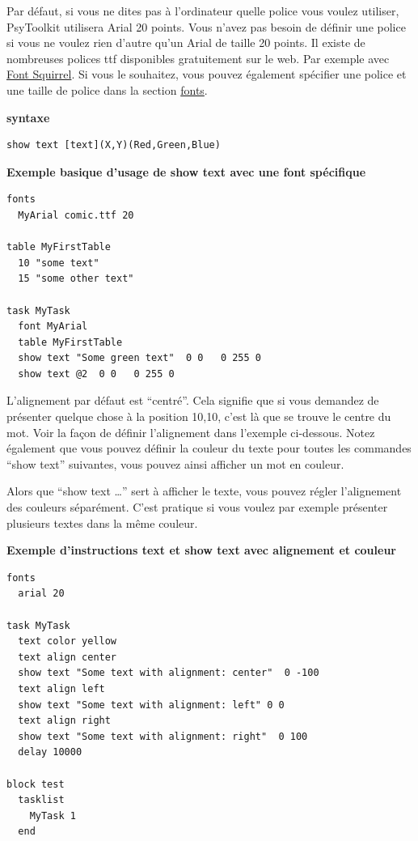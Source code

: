 \documentclass[
]{book}
\begin{document}
Par défaut, si vous ne dites pas à l'ordinateur quelle police vous
voulez utiliser, PsyToolkit utilisera Arial 20 points. Vous n'avez pas
besoin de définir une police si vous ne voulez rien d'autre qu'un Arial
de taille 20 points. Il existe de nombreuses polices ttf disponibles
gratuitement sur le web. Par exemple avec
\href{https://www.fontsquirrel.com/}{Font Squirrel}. Si vous le
souhaitez, vous pouvez également spécifier une police et une taille de
police dans la section \protect\hyperlink{fonts}{fonts}.

\textbf{syntaxe}

\begin{verbatim}
show text [text](X,Y)(Red,Green,Blue)
\end{verbatim}

\textbf{Exemple basique d'usage de show text avec une font spécifique}

\begin{verbatim}
fonts
  MyArial comic.ttf 20

table MyFirstTable
  10 "some text"
  15 "some other text"

task MyTask
  font MyArial
  table MyFirstTable
  show text "Some green text"  0 0   0 255 0
  show text @2  0 0   0 255 0
\end{verbatim}

L'alignement par défaut est ``centré''. Cela signifie que si vous
demandez de présenter quelque chose à la position 10,10, c'est là que se
trouve le centre du mot. Voir la façon de définir l'alignement dans
l'exemple ci-dessous. Notez également que vous pouvez définir la couleur
du texte pour toutes les commandes ``show text'' suivantes, vous pouvez
ainsi afficher un mot en couleur.

Alors que ``show text \ldots{}'' sert à afficher le texte, vous pouvez
régler l'alignement des couleurs séparément. C'est pratique si vous
voulez par exemple présenter plusieurs textes dans la même couleur.

\textbf{Exemple d'instructions text et show text avec alignement et
couleur}

\begin{verbatim}
fonts
  arial 20

task MyTask
  text color yellow
  text align center
  show text "Some text with alignment: center"  0 -100
  text align left
  show text "Some text with alignment: left" 0 0
  text align right
  show text "Some text with alignment: right"  0 100
  delay 10000

block test
  tasklist
    MyTask 1
  end
\end{verbatim}
\end{document}
